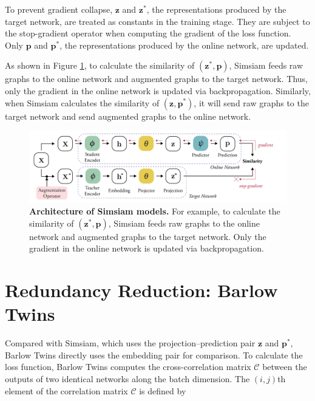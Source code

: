 To prevent gradient collapse, $\textbf{z}$ and $\textbf{z}^{*}$, the representations produced by the target network, are treated as constants in the training stage. They are subject to the stop-gradient operator when computing the gradient of the loss function. Only $\mathbf{p}$ and $\mathbf{p}^{*}$, the representations produced by the online network, are updated.

As shown in Figure \ref{fig:arch-simsiam}, to calculate the similarity of $(\textbf{z}^{*},\textbf{p})$, Simsiam feeds raw graphs to the online network and augmented graphs to the target network. Thus, only the gradient in the online network is updated via backpropagation. Similarly, when Simsiam calculates the similarity of $(\textbf{z},\textbf{p}^{*})$, it will send raw graphs to the target network and send augmented graphs to the online network.


\begin{figure}[!htbp]
\includegraphics[width=1\textwidth]{./figures/model3_simsiam.png}
\vspace{0.5cm}
\caption[Architecture of Simsiam models]{\textbf{Architecture of Simsiam models.} For example, to calculate the similarity of $(\textbf{z}^{*},\textbf{p})$, Simsiam feeds raw graphs to the online network and augmented graphs to the target network. Only the gradient in the online network is updated via backpropagation.}
\label{fig:arch-simsiam}
\end{figure}




\section{Redundancy Reduction: Barlow Twins}

Compared with Simsiam, which uses the projection–prediction pair $\textbf{z}$ and $\textbf{p}^{*}$, Barlow Twins directly uses the embedding pair for comparison. To calculate the loss function, Barlow Twins \cite{bielak2021graph} computes the cross-correlation matrix $\mathcal{C}$ between the outputs of two identical networks along the batch dimension. The $(i,j)$th element of the correlation matrix $\mathcal{C}$ is defined by

